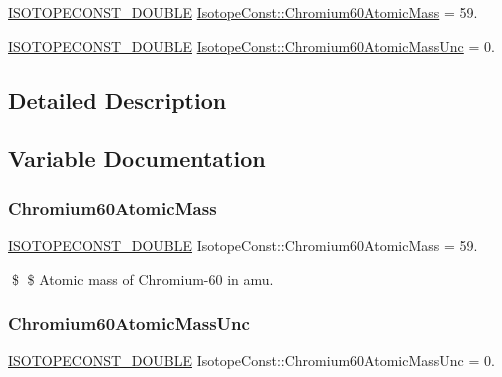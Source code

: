\begin{DoxyCompactItemize}
\item 
\mbox{\hyperlink{group___isotope_const-_macros_ga8f45a7272ce02c0b4c65c44636ed719a}{I\+S\+O\+T\+O\+P\+E\+C\+O\+N\+S\+T\+\_\+\+D\+O\+U\+B\+LE}} \mbox{\hyperlink{group___isotope_const-_chromium-_cr60_ga479ad13a5a4a25088a0fa8ad1ae50af3}{Isotope\+Const\+::\+Chromium60\+Atomic\+Mass}} = 59.
\item 
\mbox{\hyperlink{group___isotope_const-_macros_ga8f45a7272ce02c0b4c65c44636ed719a}{I\+S\+O\+T\+O\+P\+E\+C\+O\+N\+S\+T\+\_\+\+D\+O\+U\+B\+LE}} \mbox{\hyperlink{group___isotope_const-_chromium-_cr60_gaf2d97fba7a098f46b4c86f2b7d3d8ec0}{Isotope\+Const\+::\+Chromium60\+Atomic\+Mass\+Unc}} = 0.
\end{DoxyCompactItemize}


\subsection{Detailed Description}


\subsection{Variable Documentation}
\mbox{\label{group___isotope_const-_chromium-_cr60_ga479ad13a5a4a25088a0fa8ad1ae50af3}} 
\subsubsection{\texorpdfstring{Chromium60\+Atomic\+Mass}{Chromium60AtomicMass}}
{\footnotesize\ttfamily \mbox{\hyperlink{group___isotope_const-_macros_ga8f45a7272ce02c0b4c65c44636ed719a}{I\+S\+O\+T\+O\+P\+E\+C\+O\+N\+S\+T\+\_\+\+D\+O\+U\+B\+LE}} Isotope\+Const\+::\+Chromium60\+Atomic\+Mass = 59.}

\$ \$ Atomic mass of Chromium-\/60 in amu. \mbox{\label{group___isotope_const-_chromium-_cr60_gaf2d97fba7a098f46b4c86f2b7d3d8ec0}} 
\subsubsection{\texorpdfstring{Chromium60\+Atomic\+Mass\+Unc}{Chromium60AtomicMassUnc}}
{\footnotesize\ttfamily \mbox{\hyperlink{group___isotope_const-_macros_ga8f45a7272ce02c0b4c65c44636ed719a}{I\+S\+O\+T\+O\+P\+E\+C\+O\+N\+S\+T\+\_\+\+D\+O\+U\+B\+LE}} Isotope\+Const\+::\+Chromium60\+Atomic\+Mass\+Unc = 0.}

